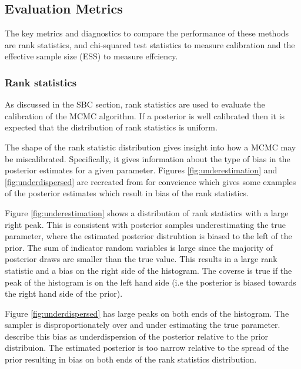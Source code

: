 \documentclass[12pt, a4paper]{article}
\begin{document}
    \subsection{Evaluation Metrics}
        The key metrics and diagnostics to compare the performance of these methods are rank statistics, and chi-squared test statistics to measure calibration and the effective sample size (ESS) to measure effciency.

        \subsubsection{Rank statistics}
            As discussed in the SBC section, rank statistics are used to evaluate the calibration of the MCMC algorithm. If a posterior is well calibrated then it is expected that the distribution of rank statistics is uniform.

            The shape of the rank statistic distribution gives insight into how a MCMC may be miscalibrated. Specifically, it gives information about the type of bias in the posterior estimates for a given parameter. Figures \ref{fig:underestimation} and \ref{fig:underdispersed} are recreated from \citet{talts2018validating} for conveience which gives some examples of the posterior estimates which result in bias of the rank statistics.

            Figure \ref{fig:underestimation} shows a distribution of rank statistics with a large right peak. This is consistent with posterior samples underestimating the true parameter, where the estimated posterior distrubtion is biased to the left of the prior. The sum of indicator random variables is large since the majority of posterior draws are smaller than the true value. This results in a large rank statistic and a bias on the right side of the histogram. The coverse is true if the peak of the histogram is on the left hand side (i.e the posterior is biased towards the right hand side of the prior). 

            Figure \ref{fig:underdispersed} has large peaks on both ends of the histogram. The sampler is disproportionately over and under estimating the true parameter. \citet{talts2018validating} describe this bias as underdispersion of the posterior relative to the prior distribuion. The estimated posterior is too narrow relative to the spread of the prior resulting in bias on both ends of the rank statistics distribution. 

        
\end{document}
